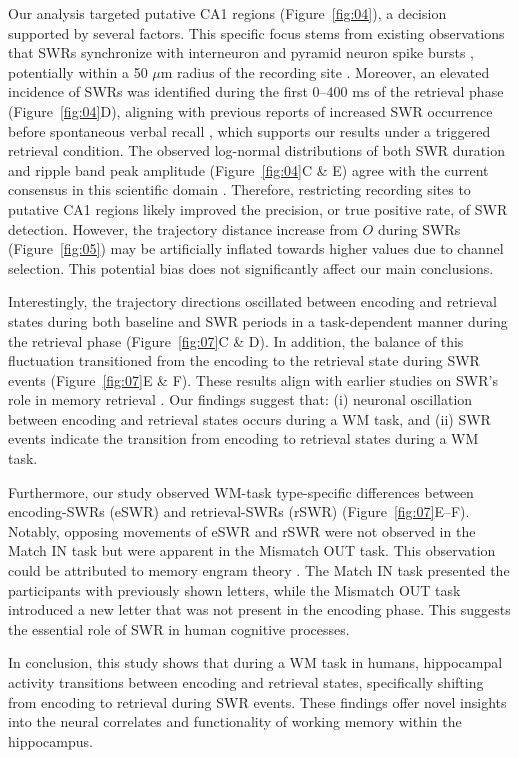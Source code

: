 Our analysis targeted putative CA1 regions (Figure~\ref{fig:04}), a decision supported by several factors. This specific focus stems from existing observations that SWRs synchronize with interneuron and pyramid neuron spike bursts \cite{buzsaki_two-stage_1989} \cite{quyen_cell_2008} \cite{royer_control_2012} \cite{hajos_input-output_2013}, potentially within a 50 $\mu$m radius of the recording site \cite{schomburg_spiking_2012}. Moreover, an elevated incidence of SWRs was identified during the first 0--400 ms of the retrieval phase (Figure~\ref{fig:04}D), aligning with previous reports of increased SWR occurrence before spontaneous verbal recall \cite{norman_hippocampal_2019} \cite{norman_hippocampal_2021}, which supports our results under a triggered retrieval condition. The observed log-normal distributions of both SWR duration and ripple band peak amplitude (Figure~\ref{fig:04}C \& E) agree with the current consensus in this scientific domain \cite{liu_consensus_2022}. Therefore, restricting recording sites to putative CA1 regions likely improved the precision, or true positive rate, of SWR detection. However, the trajectory distance increase from $O$ during SWRs (Figure~\ref{fig:05}) may be artificially inflated towards higher values due to channel selection. This potential bias does not significantly affect our main conclusions.

Interestingly, the trajectory directions oscillated between encoding and retrieval states during both baseline and SWR periods in a task-dependent manner during the retrieval phase (Figure~\ref{fig:07}C \& D). In addition, the balance of this fluctuation transitioned from the encoding to the retrieval state during SWR events (Figure~\ref{fig:07}E \& F). These results align with earlier studies on SWR's role in memory retrieval \cite{norman_hippocampal_2019} \cite{norman_hippocampal_2021}. Our findings suggest that: (i) neuronal oscillation between encoding and retrieval states occurs during a WM task, and (ii) SWR events indicate the transition from encoding to retrieval states during a WM task.

Furthermore, our study observed WM-task type-specific differences between encoding-SWRs (eSWR) and retrieval-SWRs (rSWR) (Figure~\ref{fig:07}E--F). Notably, opposing movements of eSWR and rSWR were not observed in the Match IN task but were apparent in the Mismatch OUT task. This observation could be attributed to memory engram theory \cite{liu_optogenetic_2012}. The Match IN task presented the participants with previously shown letters, while the Mismatch OUT task introduced a new letter that was not present in the encoding phase. This suggests the essential role of SWR in human cognitive processes.

In conclusion, this study shows that during a WM task in humans, hippocampal activity transitions between encoding and retrieval states, specifically shifting from encoding to retrieval during SWR events. These findings offer novel insights into the neural correlates and functionality of working memory within the hippocampus.
\label{sec:discussion}